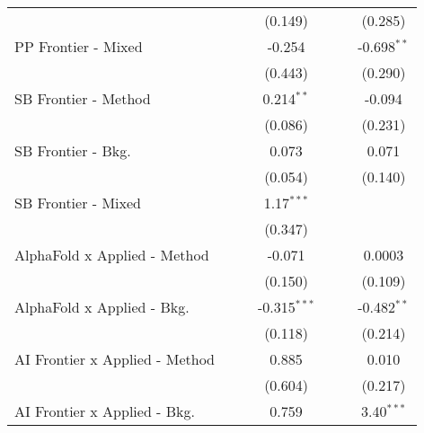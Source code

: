 \begin{tabular}{lcccccc}
                                  &                &               & (0.149)        &                &              & (0.285)\\   
   PP Frontier - Mixed            &                &               & -0.254         &                &              & -0.698$^{**}$\\   
                                  &                &               & (0.443)        &                &              & (0.290)\\   
   SB Frontier - Method           &                &               & 0.214$^{**}$   &                &              & -0.094\\   
                                  &                &               & (0.086)        &                &              & (0.231)\\   
   SB Frontier - Bkg.             &                &               & 0.073          &                &              & 0.071\\   
                                  &                &               & (0.054)        &                &              & (0.140)\\   
   SB Frontier - Mixed            &                &               & 1.17$^{***}$   &                &              &   \\   
                                  &                &               & (0.347)        &                &              &   \\   
   AlphaFold x Applied - Method   &                &               & -0.071         &                &              & 0.0003\\   
                                  &                &               & (0.150)        &                &              & (0.109)\\   
   AlphaFold x Applied - Bkg.     &                &               & -0.315$^{***}$ &                &              & -0.482$^{**}$\\   
                                  &                &               & (0.118)        &                &              & (0.214)\\   
   AI Frontier x Applied - Method &                &               & 0.885          &                &              & 0.010\\   
                                  &                &               & (0.604)        &                &              & (0.217)\\   
   AI Frontier x Applied - Bkg.   &                &               & 0.759          &                &              & 3.40$^{***}$\\   

\end{tabular}
